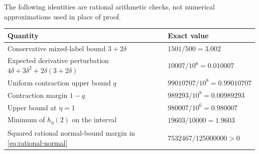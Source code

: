 \documentclass[11pt,a4paper]{article}
\numberwithin{equation}{section}
\theoremstyle{remark}
\begin{document}
The following identities are rational arithmetic checks, not numerical
approximations used in place of proof.
\begin{center}
\small
\begin{tabularx}{\textwidth}{@{}X>{\raggedleft\arraybackslash}p{}@{}}
\toprule
Quantity & Exact value \\
\midrule
Conservative mixed-label bound $3+2\delta$ & $1501/500=3.002$ \\
Expected derivative perturbation $4\delta+3\delta^2+2\delta(3+2\delta)$
 & $10007/10^6=0.010007$ \\
Uniform contraction upper bound $q$ & $99010707/10^8=0.99010707$ \\
Contraction margin $1-q$ & $989293/10^8=0.00989293$ \\
Upper bound at $\eta=1$ & $980007/10^6=0.980007$ \\
Minimum of $h_\eta(2)$ on the interval & $19603/10000=1.9603$ \\
Squared rational normal-bound margin in \eqref{eq:rational-normal}
 & $7532467/125000000>0$ \\
\bottomrule
\end{tabularx}
\end{center}
\end{document}
